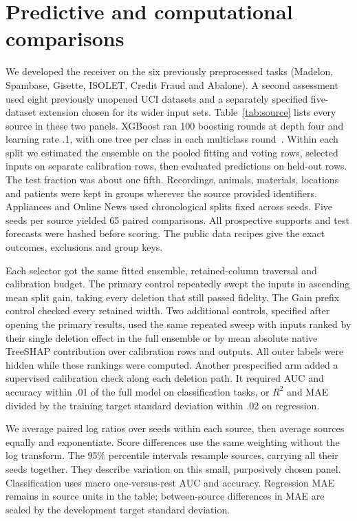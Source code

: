 \section{Predictive and computational comparisons}

We developed the receiver on the six previously preprocessed tasks (Madelon,
Spambase, Gisette, ISOLET, Credit Fraud and Abalone). A second assessment
used eight previously unopened UCI datasets and a separately specified
five-dataset extension chosen for its wider input sets. Table~\ref{tab:source}
lists every source in these two panels. XGBoost ran 100 boosting rounds
at depth four and learning rate .1, with one tree per class in each
multiclass round~\citep{chen2016xgboost}. Within each split we estimated
the ensemble on the pooled fitting and voting rows, selected inputs on
separate calibration rows, then evaluated predictions on held-out rows.
The test fraction was about one fifth. Recordings, animals, materials,
locations and patients were kept in groups wherever the source provided
identifiers. Appliances and Online News used chronological splits fixed
across seeds. Five seeds per source yielded 65 paired comparisons.
All prospective supports and test forecasts were hashed before scoring.
The public data recipes give the exact outcomes, exclusions and group keys.

Each selector got the same fitted ensemble, retained-column traversal and
calibration budget. The primary control repeatedly swept the inputs in
ascending mean split gain, taking every deletion that still passed fidelity.
The Gain prefix control checked every retained width. Two additional controls,
specified after opening the primary results, used the same repeated sweep
with inputs ranked by their single deletion effect in the full ensemble or by
mean absolute native TreeSHAP contribution over calibration rows and outputs.
All outer labels were hidden while these rankings were computed.
Another prespecified arm added a supervised calibration check along each
deletion path. It required AUC and accuracy within .01 of the full model on
classification tasks, or $R^2$ and MAE divided by the training target
standard deviation within .02 on regression.

We average paired log ratios over seeds within each source, then average
sources equally and exponentiate. Score differences use the same weighting
without the log transform. The 95\% percentile intervals resample sources,
carrying all their seeds together. They describe variation on this small,
purposively chosen panel. Classification uses macro one-versus-rest AUC
and accuracy. Regression MAE remains in source units in the table;
between-source differences in MAE are scaled by the development target
standard deviation.

